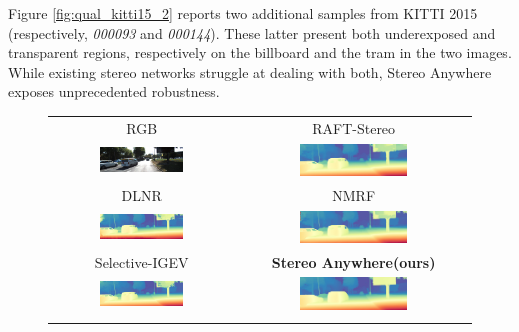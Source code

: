 \documentclass[10pt,twocolumn,letterpaper]{article}
\newcommand{\method}[0]{Stereo Anywhere\xspace}
\begin{document}
\clearpage

Figure \ref{fig:qual_kitti15_2} reports two additional samples from KITTI 2015 (respectively, \textit{000093} and \textit{000144}). These latter present both underexposed and transparent regions, respectively on the billboard and the tram in the two images. While existing stereo networks struggle at dealing with both, \method exposes unprecedented robustness.

\begin{figure}[h]
    \centering
    \renewcommand{\tabcolsep}{1pt}
    \begin{tabular}{cc}
        \small RGB &
        \small RAFT-Stereo \cite{lipson2021raft} \\
        \includegraphics[width=0.48\textwidth]{imgs/KITTI/rgb/93.jpg} &
        \includegraphics[width=0.48\textwidth]{imgs/KITTI/stereo/RAFT-Stereo/93.jpg} \\
        \small DLNR \cite{zhao2023high} &
        \small NMRF \cite{guan2024neural} \\
        \includegraphics[width=0.48\textwidth]{imgs/KITTI/stereo/DLNR/93.jpg} &
        \includegraphics[width=0.48\textwidth]{imgs/KITTI/stereo/NMRF/93.jpg} \\
        \small Selective-IGEV \cite{wang2024selective} &
        \textbf{\method (ours)} \\
        \includegraphics[width=0.48\textwidth]{imgs/KITTI/stereo/Selective/93.jpg} &
        \includegraphics[width=0.48\textwidth]{imgs/KITTI/stereo/Ours/93.jpg} \\ \\


\end{tabular}
\end{figure}
\end{document}
